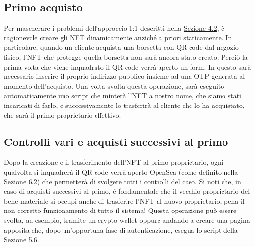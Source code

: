 \documentclass[12pt]{report}
\begin{document}
\subsection{Primo acquisto}
Per mascherare i problemi dell'approccio 1:1 descritti nella \hyperref[sec:1to1]{Sezione 4.2}, è ragionevole creare gli NFT dinamicamente anziché a priori staticamente. In particolare, quando un cliente acquista una borsetta con QR code dal negozio fisico, l'NFT che protegge quella borsetta non sarà ancora stato creato. Perciò la prima volta che viene inquadrato il QR code verrà aperto un form. In questo sarà necessario inserire il proprio indirizzo pubblico insieme ad una OTP generata al momento dell'acquisto.\newline
Una volta svolta questa operazione, sarà eseguito automaticamente uno script che minterà l'NFT a nostro nome, che siamo stati incaricati di farlo, e successivamente lo trasferirà al cliente che lo ha acquistato, che sarà il primo proprietario effettivo.
\subsection{Controlli vari e acquisti successivi al primo}
Dopo la creazione e il trasferimento dell'NFT al primo proprietario, ogni qualvolta si inquadrerà il QR code verrà aperto OpenSea (come definito nella \hyperref[sec:presentare]{Sezione 6.2}) che permetterà di svolgere tutti i controlli del caso.\newline
Si noti che, in caso di acquisti successivi al primo, è fondamentale che il vecchio proprietario del bene materiale si occupi anche di trasferire l'NFT al nuovo proprietario, pena il non corretto funzionamento di tutto il sistema! Questa operazione può essere svolta, ad esempio, tramite un crypto wallet oppure andando a creare una pagina apposita che, dopo un'opportuna fase di autenticazione, esegua lo script della \hyperref[sec:trasferimento]{Sezione 5.6}.
\end{document}
